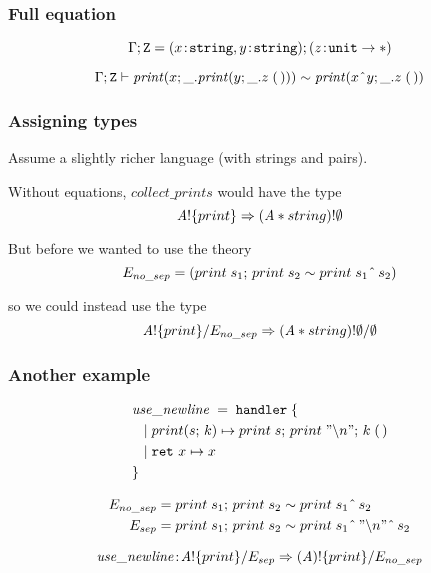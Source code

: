 \documentclass[usenames,dvipsnames]{beamer}
\begin{document}
\begin{frame}
  \frametitle{Full equation}
	\[{\Gamma};{\mathtt{Z}} = {(x \!:\! \texttt{string}, y \!:\! \texttt{string})};{(z \!:\! \mathtt{unit} \to \mathtt{*})}
	\]
	
	\[
    {{\Gamma};{\mathtt{Z}}}\vdash {
      \mathit{print}(x; \_.\mathit{print}(y; \_.{z}\;{\mathtt{(\,)}}))
      \sim\mathit{print}(x \;\hat{}\;y; \_.{z}\;{\mathtt{(\,)}})
      }
  \]
\end{frame}
\begin{frame}
	\frametitle{Assigning types}
	
	Assume a slightly richer language (with strings and pairs).

	\vspace{5mm}

	Without equations, $\mathit{collect\_prints}$ would have the type
	\[
		{\mathit{A}}!{\{{print}\}} \Rightarrow {(\mathit{A}* string)}!{\emptyset}
	\]

	\pause

	But before we wanted to use the theory
	\begin{equation*}
		E_{no\_sep} = \left( {print}\;{s_1};\, {print}\;{s_2} \sim {print}\;{s_1  \;\hat{}\; \, s_2} \right)
	\end{equation*}

	so we could instead use the type
	\[
		\ctype{\tyA}{\set{print}}{E_{no\_sep}} \hto \ctype{(\tyA * string)}{\nil}{\nil}
	\]

\end{frame}
\begin{frame}
	\frametitle{Another example}
	\begin{align*}
		&\mathit{use\_newline} \; = \; \keyhandler \; \{ \\
		&\tab | \; \operation[print]{s}{k} \mapsto \apply{print}{s};\,\apply{print}{"\backslash n"};\, \apply{k}{\unit}\\
		&\tab | \; \return{x} \mapsto x \\
		&\}
	\end{align*}

	\begin{align*}
		E_{no\_sep} &= {print}\;{s_1};\,{print}\;{s_2} \sim {print}\;{s_1 \;\hat{}\;\, s_2}\\
		E_{sep} &= {print}\;{s_1};\,{print}\;{s_2} \sim {print}\;{s_1 \;\hat{}\;\, "\backslash n" \;\hat{}\; \, s_2}	
	\end{align*}

	\[
		\mathit{use\_newline} \oftype \ctype{\tyA}{\set{print}}{E_{sep}} \hto \ctype{(\tyA)}{\set{print}}{E_{no\_sep}}
	\]

\end{frame}
\end{document}
